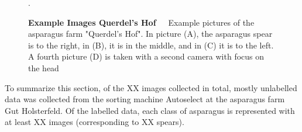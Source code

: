 \begin{figure}[h]
    \centering
    \qquad
    \qquad
    \qquad
    \caption[Example Images Querdel's Hof]{\textbf{Example Images Querdel's Hof}~~~Example pictures of the asparagus farm "Querdel's Hof". In picture (A), the asparagus spear is to the right, in (B), it is in the middle, and in (C) it is to the left. A fourth picture (D) is taken with a second camera with focus on the head}.
    \label{fig:ExampleImagesQuerdel}
\end{figure}

To summarize this section, of the XX images collected in total, mostly unlabelled data was collected from the sorting machine Autoselect at the asparagus farm Gut Holsterfeld. Of the labelled data, each class of asparagus is represented with at least XX images (corresponding to XX spears).


